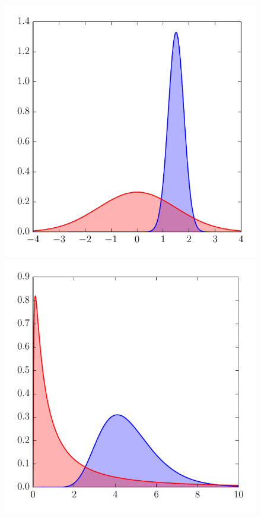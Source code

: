 \documentclass[twoside]{article}
\begin{document}
\begin{figure}
\includegraphics[scale=0.381]{hist_normal.pdf}
\includegraphics[scale=0.381]{hist_lognormal.pdf}\\[-0.6em]

\end{figure}
\end{document}
